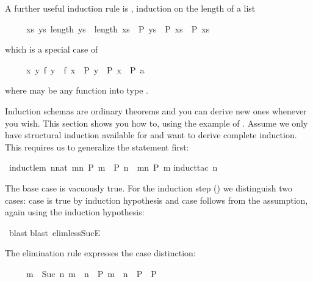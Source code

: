 \begin{isabellebody}
\begin{isamarkuptext}
A further useful induction rule is ,
induction on the length of a list
\begin{isabelle}%
\ \ \ \ \ {\isacharparenleft}{\isasymAnd}xs{\isachardot}\ {\isasymforall}ys{\isachardot}\ length\ ys\ {\isacharless}\ length\ xs\ {\isasymlongrightarrow}\ P\ ys\ {\isasymLongrightarrow}\ P\ xs{\isacharparenright}\ {\isasymLongrightarrow}\ P\ xs%
\end{isabelle}
which is a special case of 
\begin{isabelle}%
\ \ \ \ \ {\isacharparenleft}{\isasymAnd}x{\isachardot}\ {\isasymforall}y{\isachardot}\ f\ y\ {\isacharless}\ f\ x\ {\isasymlongrightarrow}\ P\ y\ {\isasymLongrightarrow}\ P\ x{\isacharparenright}\ {\isasymLongrightarrow}\ P\ a%
\end{isabelle}
where  may be any function into type .%
\end{isamarkuptext}%
%
%
\begin{isamarkuptext}%
\label{sec:derive-ind}
Induction schemas are ordinary theorems and you can derive new ones
whenever you wish.  This section shows you how to, using the example
of . Assume we only have structural induction
available for  and want to derive complete induction. This
requires us to generalize the statement first:%
\end{isamarkuptext}%
\ induct{\isacharunderscore}lem{\isacharcolon}\ {\isachardoublequote}{\isacharparenleft}{\isasymAnd}n{\isacharcolon}{\isacharcolon}nat{\isachardot}\ {\isasymforall}m{\isacharless}n{\isachardot}\ P\ m\ {\isasymLongrightarrow}\ P\ n{\isacharparenright}\ {\isasymLongrightarrow}\ {\isasymforall}m{\isacharless}n{\isachardot}\ P\ m{\isachardoublequote}\isanewline
{}induct{\isacharunderscore}tac\ n{\isacharparenright}%
\begin{isamarkuptxt}%
\noindent
The base case is vacuously true. For the induction step () we distinguish two cases: case  is true by induction
hypothesis and case  follows from the assumption, again using
the induction hypothesis:%
\end{isamarkuptxt}%
\ blast{\isacharparenright}\isanewline
{}blast\ elim{\isacharcolon}less{\isacharunderscore}SucE{\isacharparenright}%
\begin{isamarkuptext}%
\noindent
The elimination rule  expresses the case distinction:
\begin{isabelle}%
\ \ \ \ \ {\isasymlbrakk}m\ {\isacharless}\ Suc\ n{\isacharsemicolon}\ m\ {\isacharless}\ n\ {\isasymLongrightarrow}\ P{\isacharsemicolon}\ m\ {\isacharequal}\ n\ {\isasymLongrightarrow}\ P{\isasymrbrakk}\ {\isasymLongrightarrow}\ P%
\end{isabelle}


\end{isamarkuptext}
\end{isabellebody}

